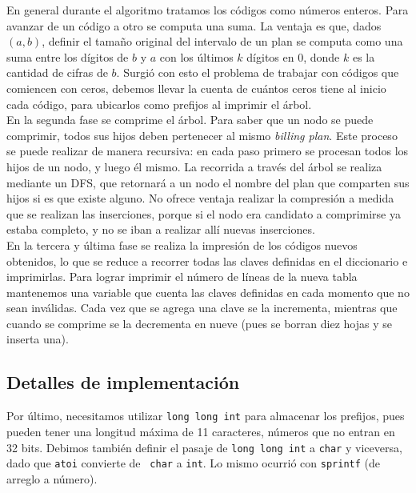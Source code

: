 En general durante el algoritmo tratamos los códigos como números
enteros. Para avanzar de un código a otro se computa una suma. La ventaja es
que, dados $(a,b)$, definir el tamaño original del intervalo de un plan se
computa como una suma entre los dígitos de $b$ y $a$ con los últimos $k$
dígitos en 0, donde $k$ es la cantidad de cifras de $b$. Surgió con esto
el problema de trabajar con códigos que comiencen con ceros, debemos llevar
la cuenta de cuántos ceros tiene al inicio cada código, para ubicarlos
como prefijos al imprimir el árbol.\\

En la segunda fase se comprime el árbol. Para saber que un nodo se puede
comprimir, todos sus hijos deben pertenecer al mismo {\sl billing plan}. Este
proceso se puede realizar de manera recursiva: en cada paso primero se
procesan todos los hijos de un nodo, y luego él mismo. La recorrida a
través del árbol se realiza mediante un DFS, que retornará a un nodo el
nombre del plan que comparten sus hijos si es que existe alguno. No ofrece
ventaja realizar la compresión a medida que se realizan las inserciones,
porque si el nodo era candidato a comprimirse ya estaba completo, y no se
iban a realizar allí nuevas inserciones.\\

En la tercera y última fase se realiza la impresión de los códigos nuevos
obtenidos, lo que se reduce a recorrer todas las claves definidas en el
diccionario e imprimirlas. Para lograr imprimir el número de líneas de
la nueva tabla mantenemos una variable que cuenta las claves definidas en
cada momento que no sean inválidas. Cada vez que se agrega una clave se
la incrementa, mientras que cuando se comprime se la decrementa en nueve
(pues se borran diez hojas y se inserta una).

\subsection*{Detalles de implementación}

Por último, necesitamos utilizar {\tt long long int} para almacenar los
prefijos, pues pueden tener una longitud máxima de 11 caracteres, números
que no entran en 32 bits. Debimos también definir el pasaje de {\tt long
long int} a {\tt char} y viceversa, dado que {\tt atoi} convierte de {\tt
char} a {\tt int}. Lo mismo ocurrió con {\tt sprintf} (de arreglo a número).


